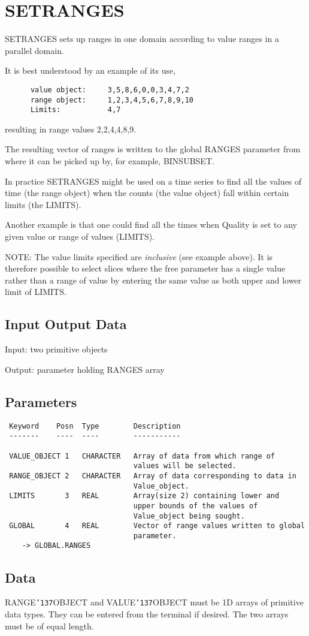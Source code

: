 \documentclass{book}
\renewcommand{\_}{{\tt\char'137}}     %
\begin{document}
\section{SETRANGES}
SETRANGES sets up ranges in one domain according to value ranges
in a parallel domain.

It is best understood by an example of its use,
\begin{verbatim}
      value object:     3,5,8,6,0,0,3,4,7,2
      range object:     1,2,3,4,5,6,7,8,9,10
      Limits:           4,7
\end{verbatim}
resulting in range values 2,2,4,4,8,9.

The resulting vector of ranges is written to the global RANGES
parameter from where it can be picked up by, for example, BINSUBSET.

In practice SETRANGES might be used on a time series to find all
the values of time (the range object) when the counts (the
value object) fall within certain limits (the LIMITS).

Another example is that one could find all the times
when Quality is set to any given
value or range of values (LIMITS).

NOTE: The value limits specified are {\em inclusive} (see
example above). It is therefore possible to
select slices where the free parameter has a
single value rather than a range of value by
entering the same value as both upper and lower
limit of LIMITS.
\subsection{Input Output Data}
Input: two primitive objects

Output: parameter holding RANGES array

\subsection{Parameters}
\begin{verbatim}
 Keyword    Posn  Type        Description
 -------    ----  ----        -----------

 VALUE_OBJECT 1   CHARACTER   Array of data from which range of
                              values will be selected.
 RANGE_OBJECT 2   CHARACTER   Array of data corresponding to data in
                              Value_object.
 LIMITS       3   REAL        Array(size 2) containing lower and
                              upper bounds of the values of
                              Value_object being sought.
 GLOBAL       4   REAL        Vector of range values written to global
                              parameter.
    -> GLOBAL.RANGES

\end{verbatim}\subsection{Data}
RANGE\_OBJECT and VALUE\_OBJECT must be 1D arrays of primitive data
types. They can be entered from the terminal if desired. The two
arrays must be of equal length.
\end{document}
